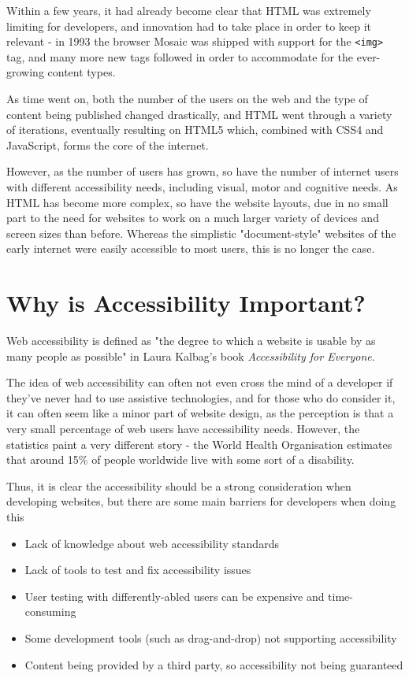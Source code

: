 \documentclass[ %
                    author={Aleena Baig},
                supervisor={Dr Simon Lock},
                    degree={BSc},
                     title={On Making Web Accessible Graphs},
                  subtitle={},
                      year={2019} ]{dissertation}
\begin{document}
Within a few years, it had already become clear that HTML was extremely limiting for developers, and innovation had to take place in order to keep it relevant - in 1993 the browser Mosaic was shipped with support for the \texttt{<img>} tag, and many more new tags followed in order to accommodate for the ever-growing content types. \cite{historyofhtml}

As time went on, both the number of the users on the web and the type of content being published changed drastically, and HTML went through a variety of iterations, eventually resulting on HTML5 which, combined with CSS4 and JavaScript, forms the core of the internet.

However, as the number of users has grown, so have the number of internet users with different accessibility needs, including visual, motor and cognitive needs. As HTML has become more complex, so have the website layouts, due in no small part to the need for websites to work on a much larger variety of devices and screen sizes than before. Whereas the simplistic "document-style" websites of the early internet were easily accessible to most users, this is no longer the case.


\section{Why is Accessibility Important?}

Web accessibility is defined as "the degree to which a
website is usable by as many people as possible" in Laura Kalbag's book \textit{Accessibility for Everyone}. \cite{accessibilityforeveryone}

The idea of web accessibility can often not even cross the mind of a developer if they've never had to use assistive technologies, and for those who do consider it, it can often seem like a minor part of website design, as the perception is that a very small percentage of web users have accessibility needs.
However, the statistics paint a very different story - the World Health Organisation estimates that around 15\% of people worldwide live with some sort of a disability. \cite{WHOdisability}

Thus, it is clear the accessibility should be a strong consideration when developing websites, but there are some main barriers for developers when doing this

\begin{itemize}
    \item Lack of knowledge about web accessibility standards
    \item Lack of tools to test and fix accessibility issues
    \item User testing with differently-abled users can be expensive and time-consuming
    \item Some development tools (such as drag-and-drop) not supporting accessibility
    \item Content being provided by a third party, so accessibility not being guaranteed
\end{itemize}
\end{document}
